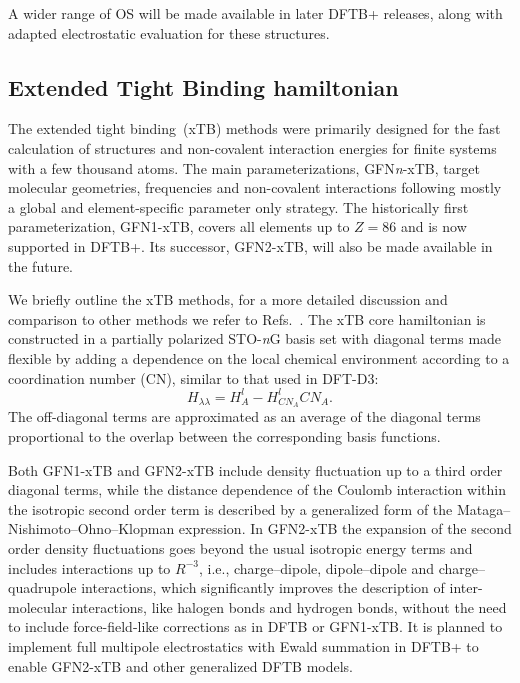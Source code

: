 \documentclass[reprint,onecolumn,superscriptaddress]{revtex4-1}
\newcommand{\dftbp}{DFTB+}
\begin{document}
A wider range of OS will be made available in later \dftbp{}
releases, along with adapted electrostatic evaluation for these structures.

\subsection{Extended Tight Binding hamiltonian}

The extended tight binding~(xTB) methods were primarily designed for the fast
calculation of structures and non-covalent interaction energies for finite
systems with a few thousand atoms. The main parameterizations, GFN\textit n-xTB,
target molecular geometries, frequencies and non-covalent interactions following
mostly a global and element-specific parameter only strategy. The historically
first parameterization, GFN1-xTB, covers all elements up to $Z=86$ and is now
supported in \dftbp{}. Its successor, GFN2-xTB,\cite{bannwarth2019} will also be
made available in the future.

We briefly outline the xTB methods, for a more detailed discussion and
comparison to other methods we refer to
Refs.~\cite{grimme2017,bannwarth2019}.  The xTB core hamiltonian is
constructed in a partially polarized STO-\textit nG basis set with diagonal
terms made flexible by adding a dependence on the local chemical environment
according to a coordination number (CN), similar to that used in
DFT-D3:\cite{grimme2010}
%
\begin{equation}
  H_{\lambda\lambda} = H^l_A - H^l_{{CN}_{A}} {CN}_{A}.
\end{equation}
%
The off-diagonal terms are approximated as an average of the diagonal terms
proportional to the overlap between the corresponding basis functions.

Both GFN1-xTB and GFN2-xTB include density fluctuation up to a third order
diagonal terms, while the distance dependence of the Coulomb interaction within
the isotropic second order term is described by a generalized form of the
Mataga--Nishimoto--Ohno--Klopman\cite{klopman1964,ohno1964,mataga1957}
expression. In GFN2-xTB the expansion of the second order density fluctuations
goes beyond the usual isotropic energy terms and includes interactions up to
$R^{-3}$, i.e., charge--dipole, dipole--dipole and charge--quadrupole
interactions, which significantly improves the description of inter-molecular
interactions, like halogen bonds and hydrogen bonds, without the need to
include force-field-like corrections as in DFTB or GFN1-xTB. It is planned to implement full multipole electrostatics with Ewald summation
in \dftbp{} to enable GFN2-xTB and other generalized DFTB
models.\cite{Bodrog2012}
\end{document}
